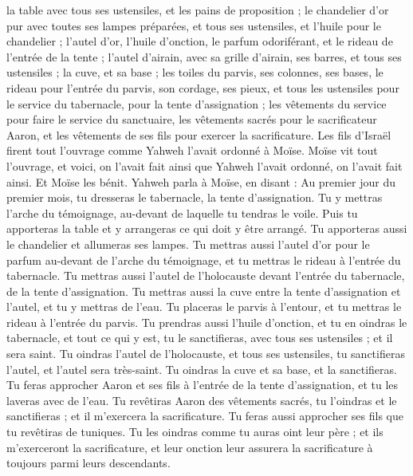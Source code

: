 \begin{multicols}{2}
la table avec tous ses ustensiles, et les pains de proposition\FTNT{} ;
le chandelier d’or pur avec toutes ses lampes préparées, et tous ses ustensiles, et l'huile pour le chandelier ;
l'autel d'or, l'huile d'onction, le parfum odoriférant, et le rideau de l’entrée de la tente ;
l'autel d'airain, avec sa grille d'airain, ses barres, et tous ses ustensiles ; la cuve, et sa base ;
les toiles du parvis, ses colonnes, ses bases, le rideau pour l’entrée du parvis, son cordage, ses pieux, et tous les ustensiles pour le service du tabernacle, pour la tente d'assignation ;
les vêtements du service pour faire le service du sanctuaire, les vêtements sacrés pour le sacrificateur Aaron, et les vêtements de ses fils pour exercer la sacrificature.
Les fils d'Israël firent tout l'ouvrage comme Yahweh l'avait ordonné à Moïse.
Moïse vit tout l'ouvrage, et voici, on l'avait fait ainsi que Yahweh l'avait ordonné, on l'avait fait ainsi. Et Moïse les bénit.
\VerseOne{}Yahweh parla à Moïse, en disant :
Au premier jour du premier mois, tu dresseras le tabernacle, la tente d'assignation.
Tu y mettras l'arche du témoignage, au-devant de laquelle tu tendras le voile.
Puis tu apporteras la table et y arrangeras ce qui doit y être arrangé. Tu apporteras aussi le chandelier et allumeras ses lampes.
Tu mettras aussi l'autel d'or pour le parfum au-devant de l'arche du témoignage, et tu mettras le rideau à l'entrée du tabernacle.
Tu mettras aussi l'autel de l'holocauste devant l'entrée du tabernacle, de la tente d'assignation.
Tu mettras aussi la cuve entre la tente d'assignation et l'autel, et tu y mettras de l'eau.
Tu placeras le parvis à l’entour, et tu mettras le rideau à l’entrée du parvis.
Tu prendras aussi l'huile d'onction, et tu en oindras le tabernacle, et tout ce qui y est, tu le sanctifieras, avec tous ses ustensiles ; et il sera saint.
Tu oindras l'autel de l'holocauste, et tous ses ustensiles, tu sanctifieras l'autel, et l'autel sera très-saint.
Tu oindras la cuve et sa base, et la sanctifieras.
Tu feras approcher Aaron et ses fils à l'entrée de la tente d'assignation, et tu les laveras avec de l'eau.
Tu revêtiras Aaron des vêtements sacrés, tu l'oindras et le sanctifieras ; et il m'exercera la sacrificature.
Tu feras aussi approcher ses fils que tu revêtiras de tuniques.
Tu les oindras comme tu auras oint leur père ; et ils m'exerceront la sacrificature, et leur onction leur assurera la sacrificature à toujours parmi leurs descendants.

\end{multicols}

